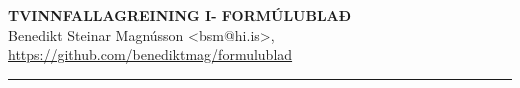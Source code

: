 \documentclass[11pt,icelandic]{article}
\begin{document}

\begin{center}
	{\Large\bf TVINNFALLAGREINING I- FORMÚLUBLAÐ}\\
    Benedikt Steinar Magnússon <bsm@hi.is>, \url{https://github.com/benediktmag/formulublad}
\end{center}

\hrule


\end{document}
